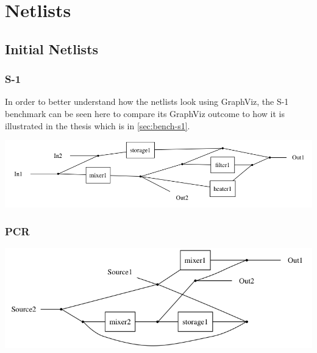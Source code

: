 \chapter{Netlists}
\label{app:netlists}

\section{Initial Netlists}
\subsection{S-1}
In order to better understand how the netlists look using GraphViz, the S-1 benchmark can be seen here to compare its GraphViz outcome to how it is illustrated in the thesis which is in \autoref{sec:bench-s1}.

\includegraphics[scale=0.35]{figures/arch-mes-example.png}

\subsection{PCR}
\includegraphics[scale=0.35]{figures/archPCR1s.png}

